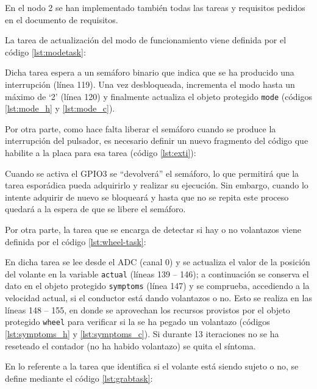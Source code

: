 En el nodo 2 se han implementado también todas las tareas y requisitos pedidos
en el documento de requisitos.

La tarea de actualización del modo de funcionamiento viene definida por el código
\ref{lst:modetask}:



Dicha tarea espera a un semáforo binario que indica que se ha producido una interrupción
(línea 119). Una vez desbloqueada, incrementa el modo hasta un máximo de `2' (línea 120)
y finalmente actualiza el objeto protegido \texttt{mode} (códigos \ref{lst:mode_h} y
\ref{lst:mode_c}).

Por otra parte, como hace falta liberar el semáforo cuando se produce la interrupción
del pulsador, es necesario definir un nuevo fragmento del código que habilite a la
placa para esa tarea (código \ref{lst:exti}):



Cuando se activa el GPIO3 se ``devolverá'' el semáforo, lo que permitirá que la tarea
esporádica pueda adquirirlo y realizar su ejecución. Sin embargo, cuando lo intente
adquirir de nuevo se bloqueará y hasta que no se repita este proceso quedará a la
espera de que se libere el semáforo.

Por otra parte, la tarea que se encarga de detectar si hay o no volantazos viene definida
por el código \ref{lst:wheel-task}:



En dicha tarea se lee desde el ADC (canal 0) y se actualiza el valor de la posición
del volante en la variable \texttt{actual} (líneas 139 -- 146); a continuación se
conserva el dato en el objeto protegido \texttt{symptoms} (línea 147) y se comprueba,
accediendo a la velocidad actual, si el conductor está dando volantazos o no. Esto se
realiza en las líneas 148 -- 155, en donde se aprovechan los recursos provistos por
el objeto protegido \texttt{wheel} para verificar si la se ha pegado un volantazo
(códigos \ref{lst:symptoms_h} y \ref{lst:symptoms_c}). Si durante 13 iteraciones no se ha
reseteado el contador (no ha habido volantazo) se quita el síntoma.

En lo referente a la tarea que identifica si el volante está siendo sujeto o no, se
define mediante el código \ref{lst:grabtask}:


